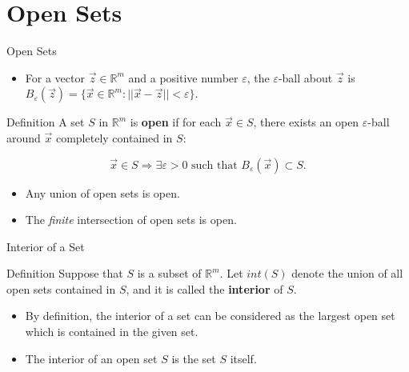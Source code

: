 \documentclass{beamer}
\begin{document}
\section{Open Sets}
\begin{frame}{Open Sets}
\begin{itemize}
    \item For a vector $\vec{z}\in \mathbb{R}^m$ and a positive number $\varepsilon$, the $\varepsilon$-ball about $\vec{z}$ is $B_\varepsilon(\vec{z})=\{\vec{x}\in \mathbb{R}^m: ||\vec{x}-\vec{z}||<\varepsilon\}$.
\end{itemize}
    \begin{block}{Definition}
    A set $S$ in $\mathbb{R}^m$ is \textbf{open} if for each $\vec{x}\in S$, there exists an open $\varepsilon$-ball around $\vec{x}$ completely contained in $S$:
    
    \[\vec{x}\in S \Rightarrow \exists \varepsilon>0 \text{ such that }B_\varepsilon(\vec{x})\subset S.
    \]
    \end{block}
    \begin{itemize}
        \item Any union of open sets is open. 
        \item The \textit{finite} intersection of open sets is open. 
    \end{itemize}
\end{frame}
\begin{frame}{Interior of a Set}
\begin{block}{Definition}
Suppose that $S$ is a subset of $\mathbb{R}^m$. Let $int(S)$ denote the union of all open sets contained in $S$, and it is called the \textbf{interior } of $S$.
\end{block}
\begin{itemize}
    \item By definition, the interior of  a set can be considered as the largest open set which is contained in the given set. 
    \item The interior of an open set $S$ is the set $S$ itself.
\end{itemize}
    
\end{frame}
\end{document}
